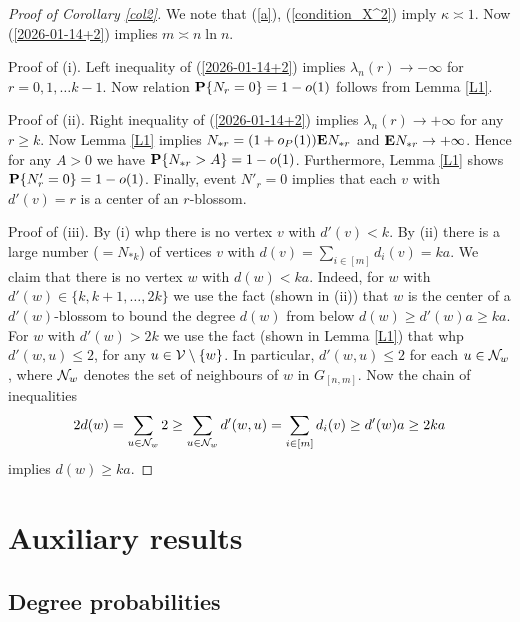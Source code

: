 \documentclass[11pt, a4paper]{article}
\newcommand{\E}{{\bf{E}}}
\newcommand{\PP}{{\bf{P}}}
\begin{document}
\begin{proof}[Proof of Corollary \ref{col2}]  
We note that
(\ref{a}),
(\ref{condition_X^2}) imply $\kappa\asymp 1$. 
Now 
(\ref{2026-01-14+2}) 
implies
$m\asymp n\ln n$.

Proof of (i). Left inequality of (\ref{2026-01-14+2}) 
implies 
$\lambda_n(r)\to-\infty$
for $r=0, 1,\dots k-1$.
 Now relation $\PP\{N_r=0\}=1-o(1)$ follows from Lemma \ref{L1}.

Proof of (ii).  
Right inequality of (\ref{2026-01-14+2}) 
implies 
$\lambda_n(r)\to+\infty$
for any $r\ge k$.
Now  Lemma \ref{L1} implies 
$N_{*r}=(1+o_P(1))\E N_{*r}$ and $\E N_{*r}\to+\infty$. Hence for any $A>0$ we have $\PP\{N_{*r}>A\}=1-o(1)$. Furthermore, Lemma \ref{L1} shows
$\PP\{N'_r=0\}=1-o(1)$.
Finally, event $N'_r=0$ 
implies that each $v$ with $d'(v)=r$ is a 
center of an $r$-blossom.




Proof of (iii). 
By (i) whp there is no vertex $v$ with $d'(v)<k$. 
By (ii) there is a large number ($=N_{*k}$) of vertices $v$ with $d(v)=\sum_{i\in[m]}d_i(v)=ka$. 
We claim that there is no vertex $w$ with $d(w)<ka$.  Indeed, for
$w$ with $d'(w)\in\{k,k+1,\dots, 2k\}$ we use the fact (shown in (ii)) that $w$ is the center of a $d'(w)$-blossom to bound the degree $d(w)$ from below
$d(w)\ge d'(w) a \ge ka$. For $w$ with $d'(w)>2k$ we use the fact (shown in Lemma \ref{L1}) that whp
$d'(w,u)\le 2$, for any  $u\in {\cal V}\setminus\{w\}$.
In particular, $d'(w,u)\le 2$ for each $u\in {\cal N}_w$, where ${\cal N}_w$ denotes the set of neighbours of $w$ in
$G_{[n,m]}$.  Now the chain of inequalities
\begin{align*}
2d(w)
=
\sum_{u\in{\cal N}_w}2
\ge
\sum_{u\in{\cal N}_w}d'(w,u)
= 
\sum_{i\in[m]}d_i(v)
\ge 
d'(w) a
\ge 2ka
\end{align*}
implies $d(w)\ge ka$. 
\end{proof}




\section{Auxiliary results}

\subsection{Degree probabilities}
\end{document}
